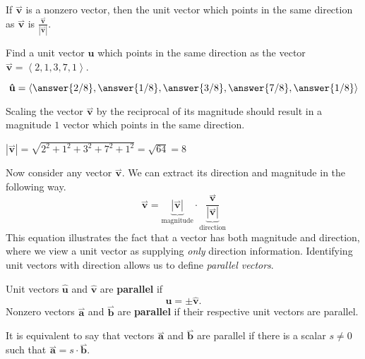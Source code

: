 \documentclass{ximera}
\begin{document}
\begin{theorem}
  If $\overset{\rightharpoonup}{\mathbf{v}}$ is a nonzero vector, then the unit vector which points
  in the same direction as $\overset{\rightharpoonup}{\mathbf{v}}$ is $\frac{\overset{\rightharpoonup}{\mathbf{v}}}{|\overset{\rightharpoonup}{\mathbf{v}}|}$.
\end{theorem}


\begin{question}
  Find a unit vector $\mathbf{\hat{u}}$ which points in the same direction as the vector $\overset{\rightharpoonup}{\mathbf{v}} = \left\langle 2,1,3,7,1 \right\rangle$.
  \begin{prompt}
  \[
  \mathbf{\hat{u}} = \left\langle 
    \answer{2/8},
    \answer{1/8},
    \answer{3/8},
    \answer{7/8},
    \answer{1/8} \right\rangle
  \]
  \end{prompt}
  \begin{hint}
    Scaling the vector $\overset{\rightharpoonup}{\mathbf{v}}$ by the reciprocal of its magnitude should result in a magnitude $1$ vector which points in the same direction.
  \end{hint}
  \begin{hint}
    $|\overset{\rightharpoonup}{\mathbf{v}}| = \sqrt{2^2+1^2+3^2+7^2+1^2} = \sqrt{64} = 8$
  \end{hint}
\end{question}

Now consider any vector $\overset{\rightharpoonup}{\mathbf{v}}$. We can  extract its direction
and magnitude in the following way.
\[
\overset{\rightharpoonup}{\mathbf{v}} = \underbrace{|\overset{\rightharpoonup}{\mathbf{v}}|}_{\text{magnitude}} \cdot \underbrace{\frac{\overset{\rightharpoonup}{\mathbf{v}}}{|\overset{\rightharpoonup}{\mathbf{v}}|}}_{\text{direction}}
\]
This equation illustrates the fact that a vector has both magnitude
and direction, where we view a unit vector as supplying \textit{only}
direction information. Identifying unit vectors with direction allows
us to define \textit{parallel vectors}.
\begin{definition}
Unit vectors $\mathbf{\hat{u}}$ and $\mathbf{\hat{v}}$ are \textbf{parallel} if
\[
\mathbf{\hat{u}} = \pm \mathbf{\hat{v}}.
\]
Nonzero vectors $\overset{\rightharpoonup}{\mathbf{a}}$ and $\overset{\rightharpoonup}{\mathbf{b}}$ are \textbf{parallel} if their
respective unit vectors are parallel.
\end{definition}
It is equivalent to say that vectors $\overset{\rightharpoonup}{\mathbf{a}}$ and $\overset{\rightharpoonup}{\mathbf{b}}$ are
parallel if there is a scalar $s\neq 0$ such that $\overset{\rightharpoonup}{\mathbf{a}} =
s\cdot\overset{\rightharpoonup}{\mathbf{b}}$.
\end{document}
